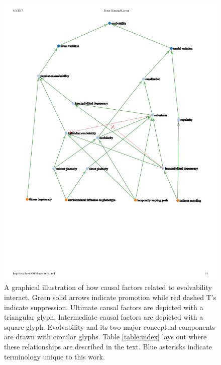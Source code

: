 \begin{figure}[!htbp]
  \includegraphics[width=\textwidth]{img/mindmap}
  \captionsetup{singlelinecheck=off,justification=raggedright}
  \caption[Schematic of Interplay between Concepts Related to Evolvability]{A graphical illustration of how causal factors related to evolvability interact. Green solid arrows indicate promotion while red dashed T's indicate suppression. Ultimate causal factors are depicted with a triangular glyph. Intermediate causal factors are depicted with a square glyph. Evolvability and its two major conceptual components are drawn with circular glyphs. Table \ref{table:index} lays out where these relationships are described in the text. Blue asterisks indicate terminology unique to this work.}
     \label{fig:mindmap}
\end{figure}